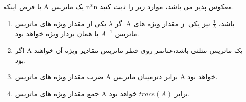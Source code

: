 با فرض اینکه A یک ماتریس n*n معکوس پذیر می باشد،‌ موارد زیر را ثابت کنید.

\begin{enumerate}[label=(\alph*)]
	\item
	اگر $\lambda $ یکی از مقدار ویژه های ماتریس A باشد،‌ $\frac{1}{\lambda }$ نیز یکی از مقدار ویژه های ماتریس ${A^{ - 1}}$ با همان بردار ویژه خواهد بود.
	\item
	اگر A یک ماتریس مثلثی باشد،‌عناصر روی قطر ماتریس مقادیر ویژه آن خواهند بود.
	\item
	ضرب مقدار ویژه های ماتریس A برابر دترمینان ماتریس A خواهد بود.
	\item
	جمع مقدار ویژه های ماتریس A برابر $trace(A)$ خواهد بود.
\end{enumerate}